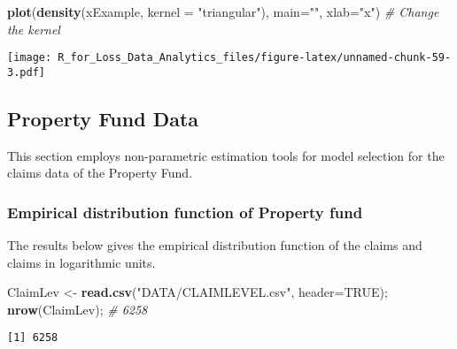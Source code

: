 \documentclass[]{book}
\newenvironment{Shaded}{\begin{snugshade}}{\end{snugshade}}
\newcommand{\KeywordTok}[1]{\textcolor[rgb]{0.13,0.29,0.53}{\textbf{#1}}}
\newcommand{\DataTypeTok}[1]{\textcolor[rgb]{0.13,0.29,0.53}{#1}}
\newcommand{\DecValTok}[1]{\textcolor[rgb]{0.00,0.00,0.81}{#1}}
\newcommand{\StringTok}[1]{\textcolor[rgb]{0.31,0.60,0.02}{#1}}
\newcommand{\CommentTok}[1]{\textcolor[rgb]{0.56,0.35,0.01}{\textit{#1}}}
\newcommand{\OtherTok}[1]{\textcolor[rgb]{0.56,0.35,0.01}{#1}}
\newcommand{\OperatorTok}[1]{\textcolor[rgb]{0.81,0.36,0.00}{\textbf{#1}}}
\newcommand{\NormalTok}[1]{#1}
\theoremstyle{definition}
\theoremstyle{definition}
\theoremstyle{definition}
\theoremstyle{remark}
\begin{document}
\begin{Shaded}
\begin{Highlighting}[]
\KeywordTok{plot}\NormalTok{(}\KeywordTok{density}\NormalTok{(xExample, }\DataTypeTok{kernel =} \StringTok{"triangular"}\NormalTok{), }\DataTypeTok{main=}\StringTok{""}\NormalTok{, }\DataTypeTok{xlab=}\StringTok{"x"}\NormalTok{) }\CommentTok{# Change the kernel}
\end{Highlighting}
\end{Shaded}

\texttt{[image: R\_for\_Loss\_Data\_Analytics\_files/figure-latex/unnamed-chunk-59-3.pdf]}

\subsection{Property Fund Data}\label{property-fund-data}

This section employs non-parametric estimation tools for model selection
for the claims data of the Property Fund.

\subsubsection{Empirical distribution function of Property
fund}\label{empirical-distribution-function-of-property-fund}

The results below gives the empirical distribution function of the
claims and claims in logarithmic units.

\begin{Shaded}
\begin{Highlighting}[]
\NormalTok{ClaimLev <-}\StringTok{ }\KeywordTok{read.csv}\NormalTok{(}\StringTok{"DATA/CLAIMLEVEL.csv"}\NormalTok{, }\DataTypeTok{header=}\OtherTok{TRUE}\NormalTok{); }\KeywordTok{nrow}\NormalTok{(ClaimLev); }\CommentTok{# 6258}
\end{Highlighting}
\end{Shaded}

\begin{verbatim}
[1] 6258
\end{verbatim}

\begin{Shaded}
\end{Shaded}
\end{document}
